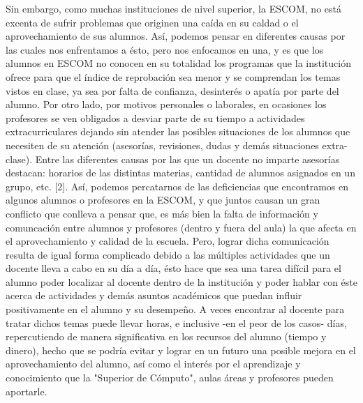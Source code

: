 Sin embargo, como muchas instituciones de nivel superior, la ESCOM, no está excenta de sufrir problemas que originen una caída en su caldad o el aprovechamiento de sus alumnos. Así, podemos pensar en diferentes causas por las cuales nos enfrentamos a ésto, pero nos enfocamos en una, y es que los alumnos en ESCOM no conocen en su totalidad los programas que la institución ofrece para que el índice de reprobación sea menor y se comprendan los temas vistos en clase, ya sea por falta de confianza, desinterés o apatía por parte del alumno. 
Por otro lado, por motivos personales o laborales, en ocasiones los profesores se ven obligados a desviar parte de su tiempo a actividades extracurriculares dejando sin atender las posibles situaciones de los alumnos que necesiten de su atención (asesorías, revisiones, dudas y demás situaciones extra-clase). Entre las diferentes causas por las que un docente no imparte asesorías destacan: horarios de las distintas materias, cantidad de alumnos asignados en un grupo, etc. [2]. 
Así, podemos percatarnos de las deficiencias que encontramos en algunos alumnos o profesores en la ESCOM, y que juntos causan un gran conflicto que conlleva a pensar que, es más bien la falta de información y comuncación entre alumnos y profesores (dentro y fuera del aula) la que afecta en el aprovechamiento y calidad de la escuela. Pero, lograr dicha comunicación resulta de igual forma complicado debido a las múltiples actividades que un docente lleva a cabo en su día a día, ésto hace que sea una tarea difícil para el alumno poder localizar al docente dentro de la institución y poder hablar con éste acerca de actividades y demás asuntos académicos que puedan influir positivamente en el alumno y su desempeño. A veces encontrar al docente para tratar dichos temas puede llevar horas, e inclusive -en el peor de los casos- días, repercutiendo de manera significativa en los recursos del alumno (tiempo y dinero), hecho que se podría evitar y lograr en un futuro una posible mejora en el aprovechamiento del alumno, así como el interés por el aprendizaje y conocimiento que la "Superior de Cómputo", aulas áreas y profesores pueden aportarle.

